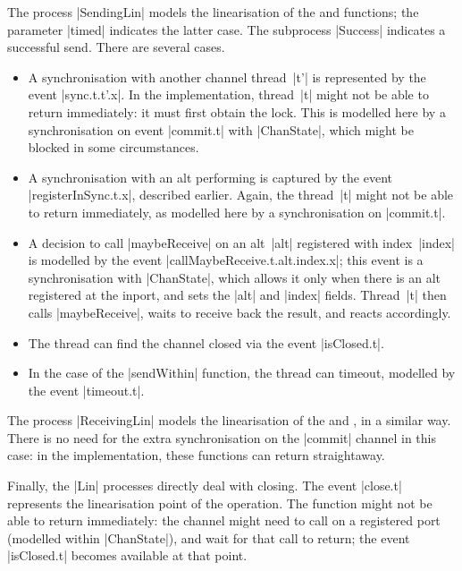 The process |SendingLin| models the linearisation of the  and
 functions; the parameter |timed| indicates the latter case.
The subprocess |Success| indicates a successful send.  There are several
cases.
%
\begin{itemize}
\item A synchronisation with another channel thread~|t'| is represented by the
  event |sync.t.t'.x|.  In the implementation, thread~|t| might not be able to
  return immediately: it must first obtain the lock.  This is modelled here by
  a synchronisation on event |commit.t| with |ChanState|, which might be
  blocked in some circumstances.

\item A synchronisation with an alt performing  is captured
  by the event |registerInSync.t.x|, described earlier.  Again, the thread~|t|
  might not be able to return immediately, as modelled here by a
  synchronisation on |commit.t|.

\item A decision to call |maybeReceive| on an alt~|alt| registered with
  index~|index| is modelled by the event |callMaybeReceive.t.alt.index.x|;
  this event is a synchronisation with |ChanState|, which allows it only when
  there is an alt registered at the inport, and sets the |alt| and |index|
  fields.  Thread~|t| then calls |maybeReceive|, waits to receive back the
  result, and reacts accordingly.

\item The thread can find the channel closed via the event |isClosed.t|.

\item In the case of the |sendWithin| function, the thread can timeout,
  modelled by the event |timeout.t|.  
\end{itemize}

The process |ReceivingLin| models the linearisation of the  and
, in a similar way.  There is no need for the extra
synchronisation on the |commit| channel in this case: in the implementation,
these functions can return straightaway. 

Finally, the |Lin| processes directly deal with closing.  The event |close.t|
represents the linearisation point of the operation.  The 
function might not be able to return immediately: the channel might need to
call  on a registered port (modelled within |ChanState|),
and wait for that call to return; the event |isClosed.t| becomes available at
that point.


